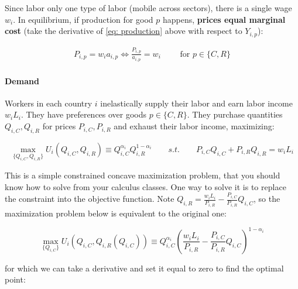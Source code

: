 \documentclass[11pt,letterpaper]{article}
\begin{document}
Since labor only one type of labor (mobile across sectors), there is a single wage $w_i$. In equilibrium, if production for good $p$ happens, \textbf{prices equal marginal cost} (take the derivative of \eqref{eq: production} above with respect to $Y_{i,p}$):

        \begin{eqnarray*}
            P_{i,p} = w_i a_{i,p} \iff \frac{P_{i,p}}{a_{i,p}} = w_i  \qquad \text{ for } p \in\{C,R\}
        \end{eqnarray*}

\paragraph{Demand} Workers in each country $i$ inelastically supply their labor and earn labor income $w_i L_i$. They have preferences over goods $p \in \{ C, R\}$. They purchase quantities $Q_{i,C}, Q_{i,R}$ for prices $P_{i,C}, P_{i,R}$ and exhaust their labor income, maximizing:

\begin{equation*}
    \max_{\{Q_{i,C}, Q_{i,R}\}} U_i(Q_{i,C}, Q_{i,R}) \equiv Q_{i,C}^{\alpha_i} Q_{i,R}^{1-\alpha_i} \qquad s.t. \qquad P_{i,C} Q_{i,C} + P_{i,R} Q_{i,R} = w_i L_i
\end{equation*}

This is a simple constrained concave maximization problem, that you should know how to solve from your calculus classes. One way to solve it is to replace the constraint into the objective function. Note $Q_{i,R} = \frac{w_i L_i}{P_{i,R}} - \frac{P_{i,C}}{P_{i,R} } Q_{i,C}$, so the maximization problem below is equivalent to the original one:

\begin{equation*}
    \max_{\{Q_{i,C}\}} U_i(Q_{i,C}, Q_{i,R}(Q_{i,C})) \equiv Q_{i,C}^{\alpha_i} \left( \frac{w_i L_i}{P_{i,R}} - \frac{P_{i,C}}{P_{i,R} } Q_{i,C} \right)^{1-\alpha_i}
\end{equation*}

\noindent for which we can take a derivative and set it equal to zero to find the optimal point:
\end{document}
